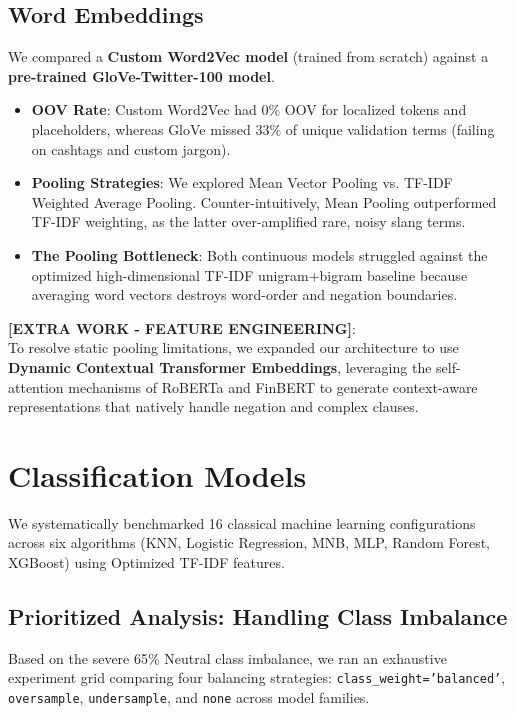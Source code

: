 \documentclass[11pt,a4paper]{article}
\begin{document}
\subsection{Word Embeddings}
We compared a \textbf{Custom Word2Vec model} (trained from scratch) against a \textbf{pre-trained GloVe-Twitter-100 model}.
\begin{itemize}[noitemsep]
    \item \textbf{OOV Rate}: Custom Word2Vec had 0\% OOV for localized tokens and placeholders, whereas GloVe missed 33\% of unique validation terms (failing on cashtags and custom jargon).
    \item \textbf{Pooling Strategies}: We explored Mean Vector Pooling vs. TF-IDF Weighted Average Pooling. Counter-intuitively, Mean Pooling outperformed TF-IDF weighting, as the latter over-amplified rare, noisy slang terms.
    \item \textbf{The Pooling Bottleneck}: Both continuous models struggled against the optimized high-dimensional TF-IDF unigram+bigram baseline because averaging word vectors destroys word-order and negation boundaries.
\end{itemize}

\noindent \textbf{[EXTRA WORK - FEATURE ENGINEERING]}: \\
To resolve static pooling limitations, we expanded our architecture to use \textbf{Dynamic Contextual Transformer Embeddings}, leveraging the self-attention mechanisms of RoBERTa and FinBERT to generate context-aware representations that natively handle negation and complex clauses.

\section{Classification Models}

We systematically benchmarked 16 classical machine learning configurations across six algorithms (KNN, Logistic Regression, MNB, MLP, Random Forest, XGBoost) using Optimized TF-IDF features.

\subsection{Prioritized Analysis: Handling Class Imbalance}
Based on the severe 65\% Neutral class imbalance, we ran an exhaustive experiment grid comparing four balancing strategies: \texttt{class\_weight='balanced'}, \texttt{oversample}, \texttt{undersample}, and \texttt{none} across model families.
\end{document}
